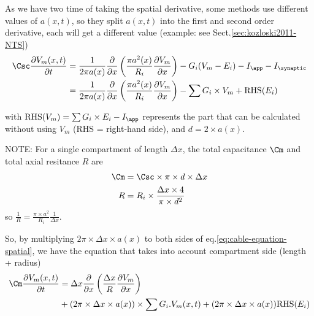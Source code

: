 As we have two time of taking the spatial derivative, some methods use different
values of $a(x,t)$, so they split $a(x,t)$ into the first and second order
derivative, each will get a different value (example: see
Sect.\ref{sec:kozloski2011-NTS})
\begin{equation}
\label{eq:cable-equation-spatial}
\begin{split}
\Csc \frac{\partial V_m(x,t)}{\partial t} &= 
\frac{1}{2\pi a(x)} \frac{\partial}{\partial x}\left( \frac{\pi a^2(x)}{R_i}
\frac{\partial V_m}{\partial x} \right)
- G_i (V_m - E_i) - I_\app - I_\synaptic   \\
&= \frac{1}{2\pi a(x)} \frac{\partial}{\partial x}\left( \frac{\pi a^2(x)}{R_i}
\frac{\partial V_m}{\partial x} \right)
- \sum G_i \times V_m + \text{RHS}(E_i)
\end{split}
\end{equation}


with $\text{RHS}({V_m}) = \sum G_i \times E_i - I_\app$ represents
the part that can be calculated without using $V_m$
(RHS = right-hand side), and $d=2\times a(x)$.

NOTE: For a single compartment of length $\Delta x$, the total capacitance 
$\Cm$
and total axial resitance $R$ are
\begin{equation}
\begin{split}
\Cm &= \Csc \times \pi \times d \times \Delta x \\
R &= R_i \times \frac{\Delta x \times 4}{\pi \times d^2}
\end{split}
\end{equation}
so $\frac{1}{R} = \frac{\pi \times a^2}{R_i}\frac{1}{\Delta x}$.

So, by multiplying $2\pi \times \Delta x \times a(x)$ to both sides of
eq.\ref{eq:cable-equation-spatial}, we have the equation that takes into account
compartment side (length + radius)
\begin{equation}
\begin{split}
\Cm \frac{\partial V_m(x,t)}{\partial t} 
&= \Delta x \frac{\partial}{\partial x}\left(
\frac{\Delta x}{R} \frac{\partial V_m}{\partial x} \right) \\
&+ (2 \pi \times \Delta x \times
a(x) ) 
\times \sum G_i . V_m(x,t) + (2\pi \times \Delta x \times
a(x)) \text{RHS}(E_i) 
\end{split}
\end{equation}


